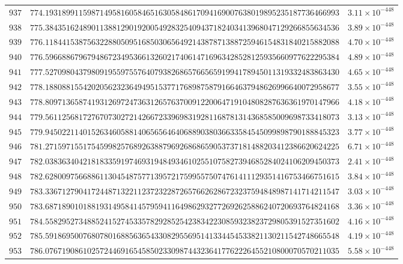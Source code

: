 \documentclass[12pt,reqno]{amsart}
\theoremstyle{remark}
\begin{document}
\begin{longtable}{clc}
$937$ & $774.1931899115987149581605846516305848617094169007638019895235187736466993$ & $3.11\times 10^{-448}$ \\
$938$ & $775.3843516248901138812901920054928325409437182403413968047129266855634536$ & $3.89\times 10^{-448}$ \\
$939$ & $776.1184415387563228805095168503065649214387871388725946154831840215882088$ & $4.70\times 10^{-448}$ \\
$940$ & $776.5966886796794867234953661326021740614716963428528125935660977622295384$ & $4.89\times 10^{-448}$ \\
$941$ & $777.5270980437980919559755764079382686576656591994178945011319332483863430$ & $4.65\times 10^{-448}$ \\
$942$ & $778.1880881554202056232364949515377176898758791664637948626996640072958677$ & $3.55\times 10^{-448}$ \\
$943$ & $778.8097136587419312697247363126576370091220064719104808287636361970147966$ & $4.18\times 10^{-448}$ \\
$944$ & $779.5611256817276707302721426672339698319281168781314368585009698733418073$ & $3.13\times 10^{-448}$ \\
$945$ & $779.9450221140152634605881406565646406889038036633584545099898790188845323$ & $3.77\times 10^{-448}$ \\
$946$ & $781.2715971551754599825768926388796926868659053737181488203412386620624225$ & $6.71\times 10^{-448}$ \\
$947$ & $782.0383634042181833591974693194849346102551075827394685284024106209450373$ & $2.41\times 10^{-448}$ \\
$948$ & $782.6280097566886113045487577139572175995575074761411129351416753466751615$ & $3.84\times 10^{-448}$ \\
$949$ & $783.3367127904172448713221123723228726576626286723237594848987141714211547$ & $3.03\times 10^{-448}$ \\
$950$ & $783.6871890101881931495841457959411649862932772692625886240720693764824168$ & $3.36\times 10^{-448}$ \\
$951$ & $784.5582952734885241527453357829285254238342230859323823729805391527351602$ & $4.16\times 10^{-448}$ \\
$952$ & $785.5918695007680780168856365433082955695141334454533821130211542748665548$ & $4.19\times 10^{-448}$ \\
$953$ & $786.0767190861025724469165458502330987443236417762226455210800070570211035$ & $5.58\times 10^{-448}$ \\

\end{longtable}
\end{document}
